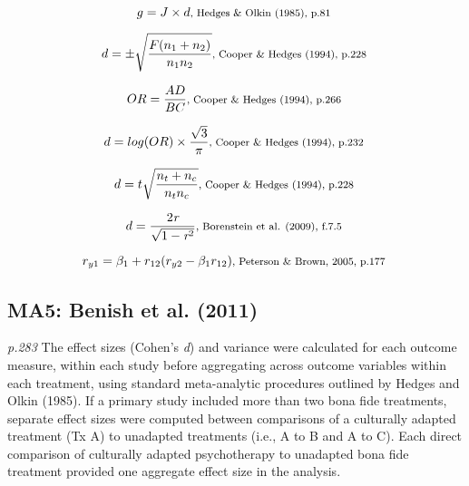 \documentclass{article}
\begin{document}
\begin{equation*}
g=J \times d \mbox{\footnotesize, Hedges \& Olkin (1985), p.81 } 
\end{equation*}

\begin{equation*}
d=\pm{\sqrt {\frac {F(n_{1}+n_{2})}{n_{1}n_{2}}}} \mbox{\footnotesize, Cooper \& Hedges (1994), p.228 }
\end{equation*}

\begin{equation*}
OR={\frac {AD}{BC}} \mbox{\footnotesize, Cooper \& Hedges (1994), p.266 }
\end{equation*}

\begin{equation*}
d=log(OR) \times {\frac {\sqrt{3}}{\pi}} \mbox{\footnotesize, Cooper \& Hedges (1994), p.232 }
\end{equation*}

\begin{equation*}
d = {t {\sqrt {\frac {n_{t} + n_{c}}{n_{t}n_{c}}}}} \mbox{\footnotesize, Cooper \& Hedges (1994), p.228 }
\end{equation*}

\begin{equation*}
d = {\frac {2 \textit{r}}{\sqrt {1 - \textit{r}^{2}}}} \mbox{\footnotesize, Borenstein et al. (2009), f.7.5 } 
\end{equation*}

\begin{equation*}
r_{y1} = \beta_{1} + r_{12}(r_{y2}-\beta_{1}r_{12}) \mbox{\footnotesize, Peterson \& Brown, 2005, p.177 } 
\end{equation*}


\subsection*{MA5: Benish et al. (2011)}

\textit{p.283} The effect sizes (Cohen’s \textit{d}) and variance were calculated for each outcome measure, within each study before aggregating across outcome variables within each treatment, using standard meta-analytic procedures outlined by Hedges and Olkin (1985). If a primary study included more than two bona fide treatments, separate effect sizes were computed between comparisons of a culturally adapted treatment (Tx A) to unadapted treatments (i.e., A to B and A to C). Each direct comparison of culturally adapted psychotherapy to unadapted bona fide treatment provided one aggregate effect size in the analysis.
\end{document}
